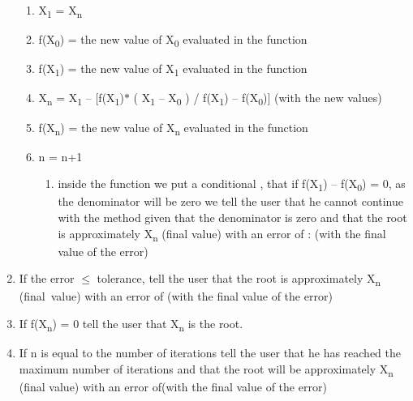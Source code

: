 \documentclass[12pt]{article}
\renewcommand{\_}{\kern-1.5pt\textunderscore\kern-1.5pt}
\begin{document}
\begin{enumerate}
\begin{enumerate}
	\item X\textsubscript{1 }= X\textsubscript{n }\par

	\item f(X\textsubscript{0}) = the new value of X\textsubscript{0} evaluated in the function \par

	\item f(X\textsubscript{1}) = the new value of X\textsubscript{1 }evaluated in the function\par

	\item X\textsubscript{n }= X\textsubscript{1 }– [f(X\textsubscript{1})$\ast$ ( X\textsubscript{1 }– X\textsubscript{0 }) / f(X\textsubscript{1}) – f(X\textsubscript{0})] (with the new values)\par

	\item f(X\textsubscript{n}) = the new value of X\textsubscript{n }evaluated in the function \par

	\item n = n+1 \par

\begin{enumerate}
	\item inside the function we put a conditional , that if f(X\textsubscript{1}) – f(X\textsubscript{0}) = 0, as the denominator will be zero we tell the user that he cannot continue with the method given that the denominator is zero and that the root is approximately X\textsubscript{n }(final value) with an error of :\_\_\_ (with the final value of the error)\par


\end{enumerate}
\end{enumerate}
	\item If the error $ \leq $  tolerance, tell the user that the root is approximately X\textsubscript{n }(final\ value) with an error of \_\_\_\_ (with the final value of the error)\par

	\item If f(X\textsubscript{n}) = 0 tell the user that X\textsubscript{n }is the root. \par

	\item If n is equal to the number of iterations tell the user that he has reached the maximum number of iterations and that the root will be approximately X\textsubscript{n }(final value) with an error of\_\_\_\_(with the final value of the error)
\end{enumerate}\par


\vspace{\baselineskip}

\printbibliography
\end{document}
